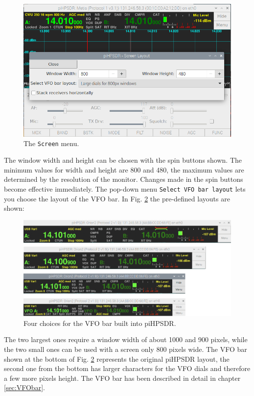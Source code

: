 \documentclass[12pt]{book}
\def\rett#1{\texttt{\color{red}#1}}
\def\bltt#1{\texttt{\color{blue}#1}}
\begin{document}
\begin{figure}[h]
\center
\includegraphics[width=12cm]{ScreenMenu.png}
\caption{The \bltt{Screen} menu.}
\label{fig:ScreenMenu}
\end{figure}

The window width and height can be chosen with the spin buttons shown. The minimum
values for width and height are 800 and 480, the maximum values are determined by
the resolution of the monitor. Changes made in the spin buttons become effective
immediately.
The pop-down menu \rett{Select VFO bar layout} lets you choose the layout of the VFO
bar. In Fig. \ref{fig:VFObarChoice} the pre-defined layouts are shown:

\begin{figure}[h!]
\center
\includegraphics[width=12cm]{VFObarChoice.png}
\caption{Four choices for the VFO bar built into piHPSDR.}
\label{fig:VFObarChoice}
\end{figure}

The two largest ones require a window width of about 1000 and 900 pixels, while the
two small ones can be used with a screen only 800 pixels wide. The VFO bar shown
at the bottom of Fig. \ref{fig:VFObarChoice} represents the original piHPSDR layout,
the second one from the bottom has larger characters for the VFO dials and therefore
a few more pixels height. The VFO bar has been described in detail in chapter
\ref{sec:VFObar}.
\end{document}
